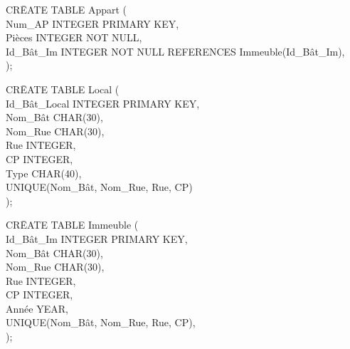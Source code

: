 \documentclass[a4paper,10.5pt]{report}
\begin{document}
		\begin{tabbing}
			CR\=EATE TABLE Appart (\\
			\> Num\_AP INTEGER PRIMARY KEY,\\
			\> Pièces INTEGER NOT NULL,\\
			\> Id\_Bât\_Im INTEGER NOT NULL REFERENCES Immeuble(Id\_Bât\_Im),\\);
		\end{tabbing}
                                                   
		\begin{tabbing}
			CR\=EATE TABLE Local (\\
			\> Id\_Bât\_Local INTEGER PRIMARY KEY,\\
			\> Nom\_Bât CHAR(30),\\
			\> Nom\_Rue CHAR(30),\\
			\> Rue INTEGER,\\
			\> CP INTEGER,\\
			\> Type CHAR(40),\\
			\> UNIQUE(Nom\_Bât, Nom\_Rue, Rue, CP)\\);
		\end{tabbing}
		\begin{tabbing}
			CR\=EATE TABLE Immeuble (\\
			\> Id\_Bât\_Im INTEGER PRIMARY KEY,\\
			\> Nom\_Bât CHAR(30),\\
			\> Nom\_Rue CHAR(30),\\
			\> Rue INTEGER,\\
			\> CP INTEGER,\\
			\> Année YEAR,\\
			\> UNIQUE(Nom\_Bât, Nom\_Rue, Rue, CP),\\);
		\end{tabbing}
\end{document}
